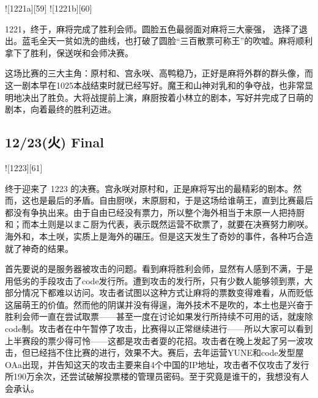 ![1221a][59]
![1221b][60]

1221，终于，麻将完成了胜利会师。圆脸五色最弱面对麻将三大豪强， 选择了退出。蓝毛全天一贫如洗的曲线，也打破了圆脸“三百散票可称王”的吹嘘。麻将顺利拿下了胜利，保送咲和会师决赛。

这场比赛的三大主角：原村和、宫永咲、高鸭稳乃，正好是麻将外群的群头像，而这一剧本早在1025本战结束时就已经写好。魔王和山神对乳和的争夺战，也非常显明地决出了胜负。大将战提前上演，麻厨按着小林立的剧本，写好并完成了日萌的剧本，向着最终的胜利迈进。

\subsection{12/23(火) Final}


![1223][61]

终于迎来了 1223 的决赛。宫永咲对原村和，正是麻将写出的最精彩的剧本。然而，这也是最后的矛盾。自由厨咲，末原厨和，于是这场给谁萌王，直到比赛最后都没有争执出来。由于自由已经没有票力，所以整个海外相当于末原一人把持厨和；而本土则是以まこ厨为代表，表示既然运营不砍票了，就要在决赛努力刷咲。海外和，本土咲，实质上是海外的碾压。但是这天发生了奇妙的事件，各种巧合造就了神奇的结果。

首先要说的是服务器被攻击的问题。看到麻将胜利会师，显然有人感到不满，于是用低劣的手段攻击了code发行所。遭到攻击的发行所，只有少数人能够领到票，大部分情况下都难以访问。攻击者试图以这种方式让麻将的票数变得难看，从而贬低这届萌王的价值。然而他的阴谋并没有得逞，海外技术不是吹的，本土也是兴奋于胜利会师一直在尝试取票——甚至一度在讨论如果发行所持续不可用的话，就废除code制。攻击者在中午暂停了攻击，比赛得以正常继续进行——所以大家可以看到上半赛段的票少得可怜——这都是攻击者耍的花招。攻击者在晚上发起了另一波攻击，但已经挡不住比赛的进行，效果不大。赛后，去年运营YUNE和code发型屋OAa出现，并告知这天的攻击主要来自4个中国的IP地址，攻击者不仅攻击了发行所190万余次，还尝试破解投票楼的管理员密码。至于究竟是谁干的，我想没有人会承认。


